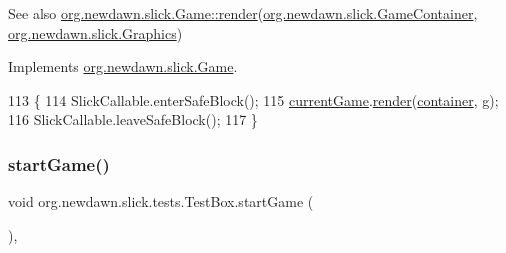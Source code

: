 \begin{DoxySeeAlso}{See also}
\mbox{\hyperlink{interfaceorg_1_1newdawn_1_1slick_1_1_game_af1a4670d43eb3ba04dfcf55ab1975b64}{org.\+newdawn.\+slick.\+Game\+::render}}(\mbox{\hyperlink{classorg_1_1newdawn_1_1slick_1_1_game_container}{org.\+newdawn.\+slick.\+Game\+Container}}, \mbox{\hyperlink{classorg_1_1newdawn_1_1slick_1_1_graphics}{org.\+newdawn.\+slick.\+Graphics}}) 
\end{DoxySeeAlso}


Implements \mbox{\hyperlink{interfaceorg_1_1newdawn_1_1slick_1_1_game_af1a4670d43eb3ba04dfcf55ab1975b64}{org.\+newdawn.\+slick.\+Game}}.


\begin{DoxyCode}
113                                                                                   \{
114         SlickCallable.enterSafeBlock();
115         \mbox{\hyperlink{classorg_1_1newdawn_1_1slick_1_1tests_1_1_test_box_a5e0fdb2f97173d828af597044c525078}{currentGame}}.\mbox{\hyperlink{interfaceorg_1_1newdawn_1_1slick_1_1_game_af1a4670d43eb3ba04dfcf55ab1975b64}{render}}(\mbox{\hyperlink{classorg_1_1newdawn_1_1slick_1_1tests_1_1_test_box_a686d64440b8b2323907a6c4641669c60}{container}}, g);
116         SlickCallable.leaveSafeBlock();
117     \}
\end{DoxyCode}
\mbox{\label{classorg_1_1newdawn_1_1slick_1_1tests_1_1_test_box_a2b2e8ec08ce37e5a97418578590279e0}} 
\subsubsection{\texorpdfstring{start\+Game()}{startGame()}}
{\footnotesize\ttfamily void org.\+newdawn.\+slick.\+tests.\+Test\+Box.\+start\+Game (\begin{DoxyParamCaption}{ }\end{DoxyParamCaption})\hspace{0.3cm}{\ttfamily [inline]}, {\ttfamily [private]}}

